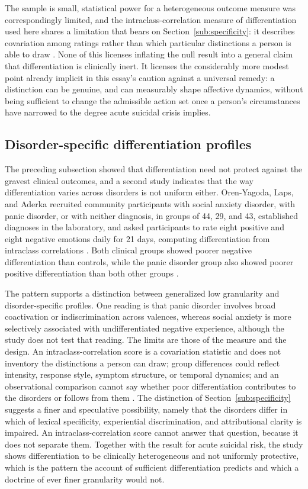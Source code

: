 \documentclass[11pt]{article}
\begin{document}
The sample is small, statistical power for a heterogeneous outcome measure was correspondingly limited, and the intraclass-correlation measure of differentiation used here shares a limitation that bears on Section~\ref{sub:specificity}: it describes covariation among ratings rather than which particular distinctions a person is able to draw \citep{Hoelscher2026}. None of this licenses inflating the null result into a general claim that differentiation is clinically inert. It licenses the considerably more modest point already implicit in this essay's caution against a universal remedy: a distinction can be genuine, and can measurably shape affective dynamics, without being sufficient to change the admissible action set once a person's circumstances have narrowed to the degree acute suicidal crisis implies.

\subsection{Disorder-specific differentiation profiles}\label{sub:profiles}

The preceding subsection showed that differentiation need not protect against the gravest clinical outcomes, and a second study indicates that the way differentiation varies across disorders is not uniform either. Oren-Yagoda, Laps, and Aderka recruited community participants with social anxiety disorder, with panic disorder, or with neither diagnosis, in groups of 44, 29, and 43, established diagnoses in the laboratory, and asked participants to rate eight positive and eight negative emotions daily for 21 days, computing differentiation from intraclass correlations \citep{OrenYagoda2026}. Both clinical groups showed poorer negative differentiation than controls, while the panic disorder group also showed poorer positive differentiation than both other groups \citep{OrenYagoda2026}.

The pattern supports a distinction between generalized low granularity and disorder-specific profiles. One reading is that panic disorder involves broad coactivation or indiscrimination across valences, whereas social anxiety is more selectively associated with undifferentiated negative experience, although the study does not test that reading. The limits are those of the measure and the design. An intraclass-correlation score is a covariation statistic and does not inventory the distinctions a person can draw; group differences could reflect intensity, response style, symptom structure, or temporal dynamics; and an observational comparison cannot say whether poor differentiation contributes to the disorders or follows from them \citep{OrenYagoda2026}. The distinction of Section~\ref{sub:specificity} suggests a finer and speculative possibility, namely that the disorders differ in which of lexical specificity, experiential discrimination, and attributional clarity is impaired. An intraclass-correlation score cannot answer that question, because it does not separate them. Together with the result for acute suicidal risk, the study shows differentiation to be clinically heterogeneous and not uniformly protective, which is the pattern the account of sufficient differentiation predicts and which a doctrine of ever finer granularity would not.
\end{document}
